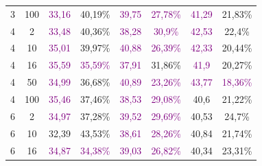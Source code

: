 \begin{table}[ht]
\begin{tabular}{cc|cc|cc|cc}
        {3}                           & {100}   & \textcolor{purple}{33,16}           & {40,19\%}                           & \textcolor{purple}{39,75}                & \textcolor{purple}{27,78\%} & \textcolor{purple}{41,29} & {21,83\%}                   \\
        {4}                           & {2}     & \textcolor{purple}{33,48}           & {40,36\%}                           & \textcolor{purple}{38,28}                & \textcolor{purple}{30,9\%}  & \textcolor{purple}{42,53} & {22,4\%}                    \\
        {4}                           & {10}    & \textcolor{purple}{35,01}           & {39,97\%}                           & \textcolor{purple}{40,88}                & \textcolor{purple}{26,39\%} & \textcolor{purple}{42,33} & {20,44\%}                   \\
        {4}                           & {16}    & \textcolor{purple}{35,59}           & \textcolor{purple}{35,59\%}         & \textcolor{purple}{37,91}                & {31,86\%}                   & \textcolor{purple}{41,9}  & {20,27\%}                   \\
        {4}                           & {50}    & \textcolor{purple}{34,99}           & {36,68\%}                           & \textcolor{purple}{40,89}                & \textcolor{purple}{23,26\%} & \textcolor{purple}{43,77} & \textcolor{purple}{18,36\%} \\
        {4}                           & {100}   & \textcolor{purple}{35,46}           & {37,46\%}                           & \textcolor{purple}{38,53}                & \textcolor{purple}{29,08\%} & {40,6}                    & {21,22\%}                   \\
        {6}                           & {2}     & \textcolor{purple}{34,97}           & {37,28\%}                           & \textcolor{purple}{39,52}                & \textcolor{purple}{29,69\%} & {40,53}                   & {24,7\%}                    \\
        {6}                           & {10}    & {32,39}                             & {43,53\%}                           & \textcolor{purple}{38,61}                & \textcolor{purple}{28,26\%} & {40,84}                   & {21,74\%}                   \\
        {6}                           & {16}    & \textcolor{purple}{34,87}           & \textcolor{purple}{34,38\%}         & \textcolor{purple}{39,03}                & \textcolor{purple}{26,82\%} & {40,34}                   & {23,31\%}                   \\

\end{tabular}
\end{table}
